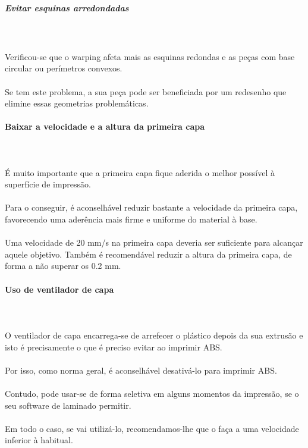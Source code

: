 \documentclass[11pt,a4paper]{article}
\begin{document}
				\subparagraph{Evitar esquinas arredondadas}\mbox{}\\\\
Verificou-se que o warping afeta mais as esquinas redondas e as peças com base circular ou perímetros convexos.
\\\\
Se tem este problema, a sua peça pode ser beneficiada por um redesenho que elimine essas geometrias problemáticas.
			\paragraph{Baixar a velocidade e a altura da primeira capa}\mbox{}\\\\
É muito importante que a primeira capa fique aderida o melhor possível à superfície de impressão.
\\\\
Para o conseguir, é aconselhável reduzir bastante a velocidade da primeira capa, favorecendo uma aderência mais firme e uniforme do material à base.
\\\\
Uma velocidade de 20 mm/s na primeira capa deveria ser suficiente para alcançar aquele objetivo. Também é recomendável reduzir a altura da primeira capa, de forma a não superar os 0.2 mm.
			\paragraph{Uso de ventilador de capa}\mbox{}\\\\
O ventilador de capa encarrega-se de arrefecer o plástico depois da sua extrusão e isto é precisamente o que é preciso evitar ao imprimir ABS.
\\\\
Por isso, como norma geral, é aconselhável desativá-lo para imprimir ABS.
\\\\
Contudo, pode usar-se de forma seletiva em alguns momentos da impressão, se o seu software de laminado permitir.
\\\\
Em todo o caso, se vai utilizá-lo, recomendamos-lhe que o faça a uma velocidade inferior à  habitual.
\end{document}
